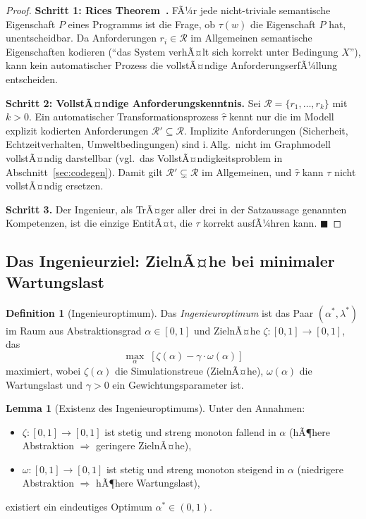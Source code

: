 ﻿\documentclass[a4paper,12pt]{article}
\theoremstyle{definition}
\newtheorem{definition}{Definition}
\newtheorem{lemma}{Lemma}
\begin{document}
\begin{proof}
\textbf{Schritt 1: Rices Theorem~\cite{rice1953}.}
FÃ¼r jede nicht-triviale semantische Eigenschaft $P$ eines Programms ist die Frage,
ob $\tau(w)$ die Eigenschaft $P$ hat, unentscheidbar. Da Anforderungen
$r_i \in \mathcal{R}$ im Allgemeinen semantische Eigenschaften kodieren
(\enquote{das System verhÃ¤lt sich korrekt unter Bedingung $X$}), kann kein
automatischer Prozess die vollstÃ¤ndige AnforderungserfÃ¼llung entscheiden.

\textbf{Schritt 2: VollstÃ¤ndige Anforderungskenntnis.}
Sei $\mathcal{R} = \{r_1, \ldots, r_k\}$ mit $k > 0$.
Ein automatischer Transformationsprozess $\hat{\tau}$ kennt nur die im Modell
explizit kodierten Anforderungen $\mathcal{R}' \subseteq \mathcal{R}$.
Implizite Anforderungen (Sicherheit, Echtzeitverhalten, Umweltbedingungen) sind
i.\,Allg.\ nicht im Graphmodell vollstÃ¤ndig darstellbar (vgl.\ das VollstÃ¤ndigkeitsproblem
in Abschnitt~\ref{sec:codegen}).
Damit gilt $\mathcal{R}' \subsetneq \mathcal{R}$ im Allgemeinen, und
$\hat{\tau}$ kann $\tau$ nicht vollstÃ¤ndig ersetzen.

\textbf{Schritt 3.}
Der Ingenieur, als TrÃ¤ger aller drei in der Satzaussage genannten Kompetenzen,
ist die einzige EntitÃ¤t, die $\tau$ korrekt ausfÃ¼hren kann. $\blacksquare$
\end{proof}

\subsection{Das Ingenieurziel: ZielnÃ¤he bei minimaler Wartungslast}

\begin{definition}[Ingenieuroptimum]
\label{def:ingopt}
Das \emph{Ingenieuroptimum} ist das Paar $(\alpha^*, \lambda^*)$ im Raum aus
Abstraktionsgrad $\alpha \in [0,1]$ und ZielnÃ¤he $\zeta: [0,1] \to [0,1]$, das
\[
  \max_\alpha \;\left[\zeta(\alpha) - \gamma \cdot \omega(\alpha)\right]
\]
maximiert, wobei $\zeta(\alpha)$ die Simulationstreue (ZielnÃ¤he), $\omega(\alpha)$ die
Wartungslast und $\gamma > 0$ ein Gewichtungsparameter ist.
\end{definition}

\begin{lemma}[Existenz des Ingenieuroptimums]
\label{lem:ingopt}
Unter den Annahmen:
\begin{itemize}
  \item $\zeta: [0,1] \to [0,1]$ ist stetig und streng monoton fallend in $\alpha$
        (hÃ¶here Abstraktion $\Rightarrow$ geringere ZielnÃ¤he),
  \item $\omega: [0,1] \to [0,1]$ ist stetig und streng monoton steigend in $\alpha$
        (niedrigere Abstraktion $\Rightarrow$ hÃ¶here Wartungslast),
\end{itemize}
existiert ein eindeutiges Optimum $\alpha^* \in (0,1)$.
\end{lemma}
\end{document}

